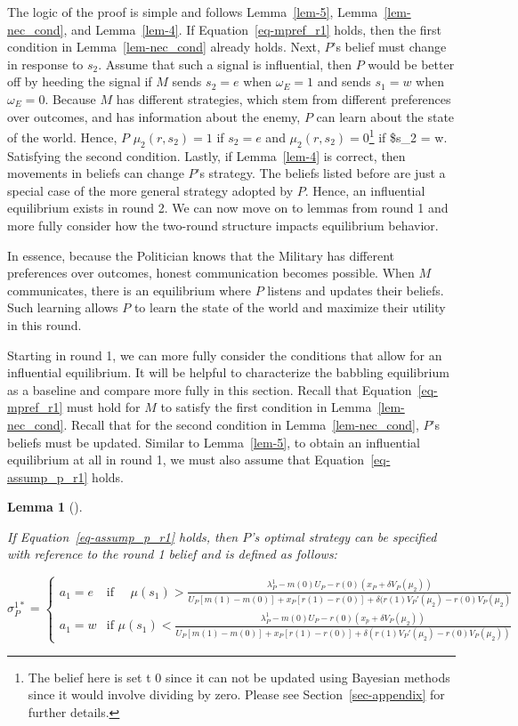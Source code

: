 \documentclass[
  12pt,
]{article}
\theoremstyle{plain}
\newtheorem{lemma}{Lemma}[section]
\theoremstyle{plain}
\theoremstyle{remark}
\begin{document}
The logic of the proof is simple and follows Lemma~\ref{lem-5},
Lemma~\ref{lem-nec_cond}, and Lemma~\ref{lem-4}. If
Equation~\ref{eq-mpref_r1} holds, then the first condition in
Lemma~\ref{lem-nec_cond} already holds. Next, \(P\)'s belief must change
in response to \(s_2\). Assume that such a signal is influential, then
\(P\) would be better off by heeding the signal if \(M\) sends \(s_2=e\)
when \(\omega_E = 1\) and sends \(s_1=w\) when \(\omega_E = 0\). Because
\(M\) has different strategies, which stem from different preferences
over outcomes, and has information about the enemy, \(P\) can learn
about the state of the world. Hence, \(P\) \(\mu_2(r, s_2) = 1\) if
\(s_2 = e\) and \(\mu_2(r, s_2)=0\)\footnote{The belief here is set t
  \(0\) since it can not be updated using Bayesian methods since it
  would involve dividing by zero. Please see Section~\ref{sec-appendix}
  for further details.} if \$s\_2 = w. Satisfying the second condition.
Lastly, if Lemma~\ref{lem-4} is correct, then movements in beliefs can
change \(P\)'s strategy. The beliefs listed before are just a special
case of the more general strategy adopted by \(P\). Hence, an
influential equilibrium exists in round 2. We can now move on to lemmas
from round 1 and more fully consider how the two-round structure impacts
equilibrium behavior.

In essence, because the Politician knows that the Military has different
preferences over outcomes, honest communication becomes possible. When
\(M\) communicates, there is an equilibrium where \(P\) listens and
updates their beliefs. Such learning allows \(P\) to learn the state of
the world and maximize their utility in this round.

Starting in round 1, we can more fully consider the conditions that
allow for an influential equilibrium. It will be helpful to characterize
the babbling equilibrium as a baseline and compare more fully in this
section. Recall that Equation~\ref{eq-mpref_r1} must hold for \(M\) to
satisfy the first condition in Lemma~\ref{lem-nec_cond}. Recall that for
the second condition in Lemma~\ref{lem-nec_cond}, \(P\)'s beliefs must
be updated. Similar to Lemma~\ref{lem-5}, to obtain an influential
equilibrium at all in round 1, we must also assume that
Equation~\ref{eq-assump_p_r1} holds.

\begin{lemma}[]\protect\hypertarget{lem-pbelief1}{}\label{lem-pbelief1}

If Equation~\ref{eq-assump_p_r1} holds, then \(P\)'s optimal strategy
can be specified with reference to the round 1 belief and is defined as
follows:

\[
\sigma^{1*}_P = 
\begin{cases}
a_1= e  & \text{if } \quad\mu(s_1)
> \frac{\lambda^1_P - m(0)U_P - r(0)(x_P + \delta V_P(\mu_2))}
 {U_P[ m(1) - m(0) ]+ x_P [r(1) -r(0)] 
 + \delta (r(1)V_P'(\mu_2) - r(0)V_P(\mu_2)}\\
a_1 = w  & \text{if } \mu(s_1)
< \frac{\lambda^1_P - m(0)U_P - r(0)(x_p + \delta V_P(\mu_2))}
 {U_P[ m(1) - m(0) ]+ x_P [r(1) -r(0)] 
 + \delta (r(1)V_P'(\mu_2) - r(0)V_P(\mu_2))}
\end{cases}
\]

\end{lemma}
\end{document}
